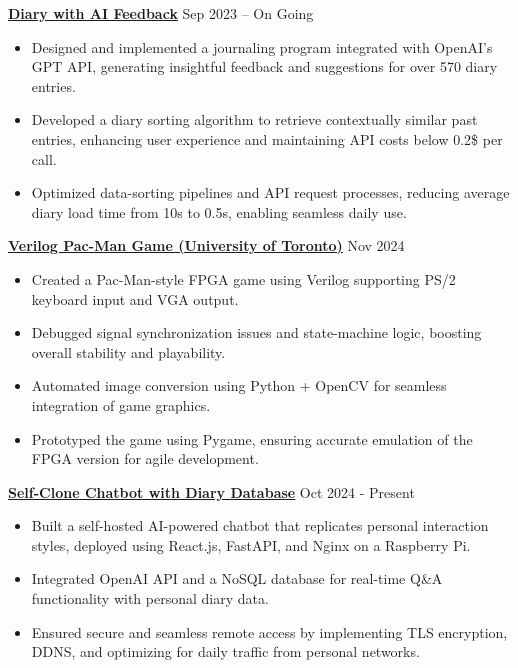 \documentclass[a4paper,10pt]{article}
\begin{document}
\noindent\href{https://github.com/Ken-2511/Diary-with-ChatGPT-Comment}{\uline{
\textbf{Diary with AI Feedback}}} \hfill Sep 2023 -- On Going
\begin{itemize}[leftmargin=0.2in]
    \item Designed and implemented a journaling program integrated with OpenAI’s GPT API, generating insightful feedback and suggestions for over 570 diary entries.
    \item Developed a diary sorting algorithm to retrieve contextually similar past entries, enhancing user experience and maintaining API costs below 0.2\$ per call.
    \item Optimized data-sorting pipelines and API request processes, reducing average diary load time from 10s to 0.5s, enabling seamless daily use.
\end{itemize}


\vspace{0.3cm}
\noindent\href{https://github.com/Ken-2511/ECE241-Project}{\uline{
\textbf{Verilog Pac-Man Game (University of Toronto)}}} \hfill Nov 2024
\begin{itemize}[leftmargin=0.2in]
    \item Created a Pac-Man-style FPGA game using Verilog supporting PS/2 keyboard input and VGA output.
    \item Debugged signal synchronization issues and state-machine logic, boosting overall stability and playability.
    \item Automated image conversion using Python + OpenCV for seamless integration of game graphics.
    \item Prototyped the game using Pygame, ensuring accurate emulation of the FPGA version for agile development.
\end{itemize}

\vspace{0.3cm}
\noindent\href{https://chengyongkang.me/chat}{\uline{
\textbf{Self-Clone Chatbot with Diary Database}}} \hfill Oct 2024 - Present
\begin{itemize}[leftmargin=0.2in]
    \item Built a self-hosted AI-powered chatbot that replicates personal interaction styles, deployed using React.js, FastAPI, and Nginx on a Raspberry Pi.
    \item Integrated OpenAI API and a NoSQL database for real-time Q\&A functionality with personal diary data.
    \item Ensured secure and seamless remote access by implementing TLS encryption, DDNS, and optimizing for daily traffic from personal networks.
\end{itemize}
\end{document}
